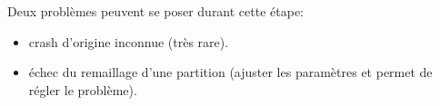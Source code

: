 	\subsubsection{\etatg}
	
Deux problèmes peuvent se poser durant cette étape:
\begin{itemize}
 \item crash d'origine inconnue (très rare).
 \item échec du remaillage d'une partition (ajuster les paramètres  et  permet de régler le problème).
\end{itemize}

